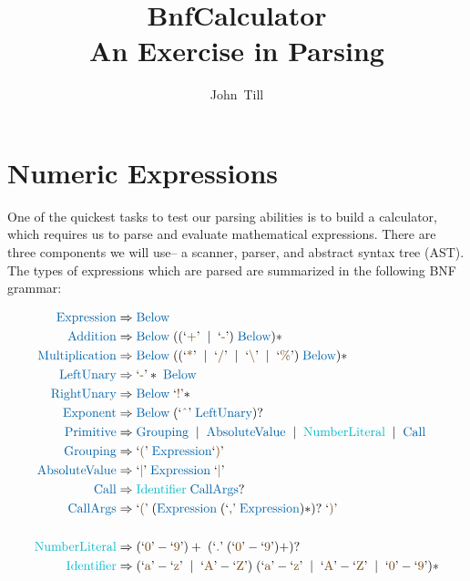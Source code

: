 \documentclass[12pt]{article}
\title{\bf \Huge{BnfCalculator} \\ \large{An Exercise in Parsing}}
\author{John~Till}
\date{}
\newcommand{\customgrammar}[1]{
\begin{align*}
#1
\end{align*}
}
\newcommand{\finishrule}{}
\newcommand{\orinline}{\;\;|\;\;}
\newcommand{\terminal}[1]{\text{\textcolor{terminalcolor}{#1}}}
\newcommand{\nonterminal}[1]{\text{\textcolor{nonterminalcolor}{#1}}}
\newcommand{\direct}[1]{\text{`\textcolor{directcolor}{#1}'}}
\begin{document}
	\setcounter{page}{2}

	\maketitle

	\setcounter{page}{1}

\section{Numeric Expressions}

One of the quickest tasks to test our parsing abilities is to build a calculator, which requires us to parse and evaluate mathematical expressions. There are three components we will use-- a scanner, parser, and abstract syntax tree (AST). The types of expressions which are parsed are summarized in the following BNF grammar:

\customgrammar{
\nonterminal{Expression} &\Rightarrow \nonterminal{Below} \finishrule \\
\nonterminal{Addition} &\Rightarrow \nonterminal{Below} \; ((\direct{+} \orinline \direct{-}) \; \nonterminal{Below})* \finishrule \\
\nonterminal{Multiplication} &\Rightarrow \nonterminal{Below} \; ((\direct{*} \orinline \direct{/} \orinline \direct{$\backslash$} \orinline \direct{$\%$}) \; \nonterminal{Below})* \finishrule \\
\nonterminal{LeftUnary} &\Rightarrow \direct{-}* \; \nonterminal{Below} \finishrule \\
\nonterminal{RightUnary} &\Rightarrow \nonterminal{Below} \; \direct{!}* \finishrule \\
\nonterminal{Exponent} &\Rightarrow \nonterminal{Below} \; (\direct{\^{}} \; \nonterminal{LeftUnary})? \finishrule \\
\nonterminal{Primitive} &\Rightarrow \nonterminal{Grouping} \orinline \nonterminal{AbsoluteValue} \orinline \terminal{NumberLiteral} \orinline \nonterminal{Call} \finishrule \\
\nonterminal{Grouping} &\Rightarrow \direct{(} \; \nonterminal{Expression} \direct{)} \finishrule \\
\nonterminal{AbsoluteValue} &\Rightarrow \direct{$|$} \; \nonterminal{Expression} \; \direct{$|$} \finishrule \\
\nonterminal{Call} &\Rightarrow \terminal{Identifier} \; \nonterminal{CallArgs}? \finishrule \\
\nonterminal{CallArgs} &\Rightarrow \direct{(} \; (\nonterminal{Expression} \; (\direct{,} \; \nonterminal{Expression})*)? \; \direct{)} \finishrule \\
&\\
\terminal{NumberLiteral} &\Rightarrow (\direct{0}-\direct{9})+ \; (\direct{.} \; (\direct{0}-\direct{9})+)? \finishrule \\
\terminal{Identifier} &\Rightarrow (\direct{a}-\direct{z} \orinline \direct{A}-\direct{Z}) \; (\direct{a}-\direct{z} \orinline \direct{A}-\direct{Z} \orinline \direct{0}-\direct{9})* \finishrule
}
\end{document}
